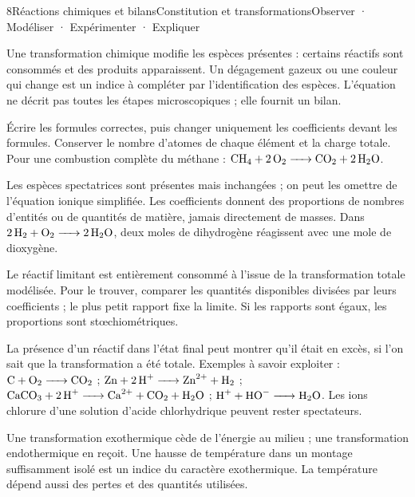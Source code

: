 \begin{ouverture}[avancement]{8}{Réactions chimiques et bilans}{Constitution et transformations}{Observer · Modéliser · Expérimenter · Expliquer}
\end{ouverture}
\essentiel
{}
Une transformation chimique modifie les espèces présentes : certains réactifs sont consommés et des produits apparaissent. Un dégagement gazeux ou une couleur qui change est un indice à compléter par l'identification des espèces. L'équation ne décrit pas toutes les étapes microscopiques ; elle fournit un bilan.
\begin{savoirfaire}[Ajuster]Écrire les formules correctes, puis changer uniquement les coefficients devant les formules. Conserver le nombre d'atomes de chaque élément et la charge totale. Pour une combustion complète du méthane : $\ce{CH4 + 2 O2 -> CO2 + 2 H2O}$.\end{savoirfaire}
Les espèces spectatrices sont présentes mais inchangées ; on peut les omettre de l'équation ionique simplifiée.
Les coefficients donnent des proportions de nombres d'entités ou de quantités de matière, jamais directement de masses. Dans $\ce{2 H2 + O2 -> 2 H2O}$, deux moles de dihydrogène réagissent avec une mole de dioxygène.
\begin{definition}Le réactif limitant est entièrement consommé à l'issue de la transformation totale modélisée. Pour le trouver, comparer les quantités disponibles divisées par leurs coefficients ; le plus petit rapport fixe la limite. Si les rapports sont égaux, les proportions sont stœchiométriques.\end{definition}
La présence d'un réactif dans l'état final peut montrer qu'il était en excès, si l'on sait que la transformation a été totale.
Exemples à savoir exploiter : $\ce{C + O2 -> CO2}$ ; $\ce{Zn + 2 H+ -> Zn^{2+} + H2}$ ; $\ce{CaCO3 + 2 H+ -> Ca^{2+} + CO2 + H2O}$ ; $\ce{H+ + HO- -> H2O}$. Les ions chlorure d'une solution d'acide chlorhydrique peuvent rester spectateurs.
\begin{propriete}Une transformation exothermique cède de l'énergie au milieu ; une transformation endothermique en reçoit. Une hausse de température dans un montage suffisamment isolé est un indice du caractère exothermique. La température dépend aussi des pertes et des quantités utilisées.\end{propriete}
